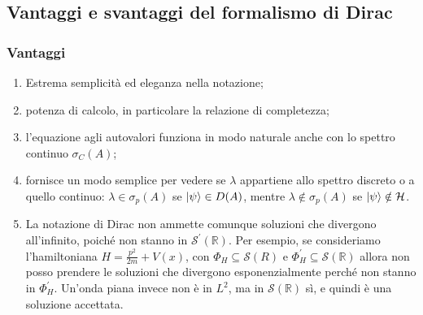 \documentclass[../../FisicaTeorica.tex]{subfiles}
\begin{document}
\subsection{Vantaggi e svantaggi del formalismo di Dirac}
\subsubsection{Vantaggi}
\begin{enumerate}
\item Estrema semplicità ed eleganza nella notazione;
\item potenza di calcolo, in particolare la relazione di completezza;
\item l'equazione agli autovalori funziona in modo naturale anche con lo spettro continuo $\sigma_C(A)$;
\item fornisce un modo semplice per vedere se $\lambda$ appartiene allo spettro discreto o a quello continuo: $\lambda \in \sigma_p(A)$ se $\ket\psi \in D(A)$, mentre $\lambda \notin \sigma_p(A)$ se $\ket\psi \notin \mathcal{H}$.
\item La notazione di Dirac non ammette comunque soluzioni che divergono all'infinito, poiché non stanno in $\mathcal{S}^\prime\left(\mathbb{R}\right)$. Per esempio, se consideriamo l'hamiltoniana $H=\frac{p^2}{2m}+V(x)$, con $\Phi_H\subseteq \mathcal S(R)$ e $\Phi_H^\prime\subseteq \mathcal S\left(\mathbb{R}\right)$
allora non posso prendere le soluzioni che divergono esponenzialmente perché non stanno in $\Phi_H^\prime$. Un'onda piana invece non è in $L^2$, ma in $\mathcal S\left(\mathbb{R}\right)$ sì, e quindi è una soluzione accettata.
\end{enumerate}
\end{document}
